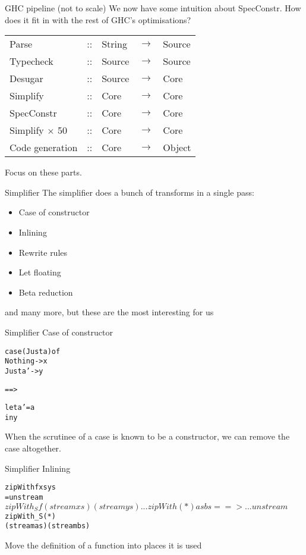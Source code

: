 \documentclass[t]{beamer}
\newcommand{\arr}{$\rightarrow$}
\newcommand{\oomph}[1]{\textcolor[rgb]{0.0,0.5,0.9}{#1}}
\begin{document}
\begin{frame}[fragile]{GHC pipeline (not to scale)}
We now have some intuition about SpecConstr. How does it fit in with the rest of GHC's optimisations?

\begin{tabular}{lllll}
Parse     & :: & String & \arr & Source
\\
Typecheck  & :: & Source & \arr & Source
\\
Desugar     & :: & Source & \arr & Core
\\
\oomph{Simplify}    & :: & Core & \arr & Core
\\
\oomph{SpecConstr} & :: & Core & \arr & Core
\\
\oomph{Simplify $\times$ 50} & :: & Core & \arr & Core
\\
Code generation & :: & Core & \arr & Object
\end{tabular}

Focus on these parts.
\end{frame}


\begin{frame}[fragile]{Simplifier}
The simplifier does a bunch of transforms in a single pass:
\begin{itemize}
\item Case of constructor
\item Inlining
\item Rewrite rules
\item Let floating
\item Beta reduction
\end{itemize}
and many more, but these are the most interesting for us
\end{frame}

\begin{frame}[fragile]{Simplifier}
Case of constructor
\begin{alltt}\Large
case (\oomph{Just a}) of
 Nothing -> x
 \oomph{Just a'} -> \oomph{y}

==>

let \oomph{a'} = \oomph{a}
in  \oomph{y}
\end{alltt}
When the scrutinee of a case is known to be a constructor, we can remove the case altogether.
\end{frame}

\begin{frame}[fragile]{Simplifier}
Inlining
\begin{alltt}\Large
zipWith f xs ys
 = unstream $ zipWith_S f
   (stream xs) (stream ys)
...
zipWith (*) as bs

==>
...
unstream $ zipWith_S (*)
(stream as) (stream bs)
\end{alltt}
Move the definition of a function into places it is used
\end{frame}
\end{document}
